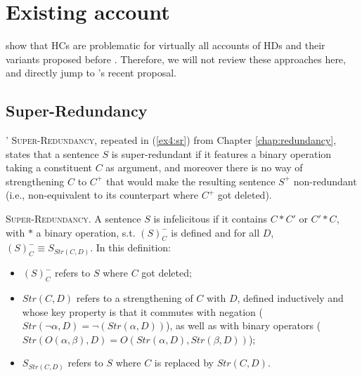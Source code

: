 \section{Existing account}\label{sec6:prev-approaches}
\citet{Mandelkern2018} show that HCs are problematic for virtually all accounts of HDs and their variants proposed before \citet{Kalomoiros2024}. Therefore, we will not review these approaches here, and directly jump to  \citeauthor{Kalomoiros2024}'s recent proposal.



\subsection{Super-Redundancy}
\citeauthor{Kalomoiros2024}' \textsc{Super-Redundancy}, repeated in (\ref{ex4:sr}) from Chapter \ref{chap:redundancy}, states that a sentence $S$ is super-redundant if it features a binary operation taking a constituent $C$ as argument, and moreover there is no way of strengthening $C$ to $C^+$ that would make the resulting sentence $S^+$ non-redundant (i.e., non-equivalent to its counterpart where $C^+$ got deleted).

\begin{exe}
	 {\textsc{Super-Redundancy.} A sentence $S$ is infelicitous if it contains $C \ast C'$ or $C' \ast C$, with $\ast$ a binary operation, s.t. $(S)^-_C$ is defined and for all $D$, $(S)^-_C \equiv S_{Str(C, D)}$. In this definition:
		\begin{itemize}
			\item $(S)^-_C$ refers to $S$ where $C$ got deleted;
			\item  $Str(C, D)$ refers to a strengthening of $C$ with $D$, defined inductively and whose key property is that it commutes with negation ($Str(\neg\alpha, D) = \neg (Str(\alpha, D))$), as well as with binary operators ($Str(O(\alpha, \beta), D) = O(Str(\alpha, D), Str(\beta, D))$);
			\item $S_{Str(C, D)}$ refers to $S$ where $C$ is replaced by $Str(C, D)$.
	\end{itemize}}
\end{exe}


